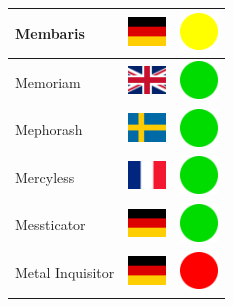\documentclass[12pt, a4paper, twoside]{report}
\begin{document}
\begin{center}
\begin{longtable}{|p{5cm}|p{2cm}|p{2cm}|}
 Membaris                                                   & \includegraphics[width=1cm]{../img/flags/de} &   \includegraphics[width=1cm]{../likes/m} \\ \hline
 Memoriam                                                   & \includegraphics[width=1cm]{../img/flags/gb} &   \includegraphics[width=1cm]{../likes/y} \\ \hline
 Mephorash                                                  & \includegraphics[width=1cm]{../img/flags/se} &   \includegraphics[width=1cm]{../likes/y} \\ \hline
 Mercyless                                                  & \includegraphics[width=1cm]{../img/flags/fr} &   \includegraphics[width=1cm]{../likes/y} \\ \hline
 Messticator                                                & \includegraphics[width=1cm]{../img/flags/de} &   \includegraphics[width=1cm]{../likes/y} \\ \hline
 Metal Inquisitor                                           & \includegraphics[width=1cm]{../img/flags/de} &   \includegraphics[width=1cm]{../likes/n} \\ \hline

\end{longtable}
\end{center}
\end{document}
